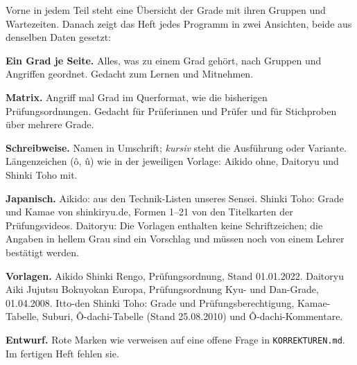 {\fontsize{10.5}{14.5}\selectfont\setlength\parskip{2.5mm}
Vorne in jedem Teil steht eine Übersicht der Grade mit ihren Gruppen und Wartezeiten.
Danach zeigt das Heft jedes Programm in zwei Ansichten, beide aus denselben Daten gesetzt:

\textbf{Ein Grad je Seite.} Alles, was zu einem Grad gehört, nach Gruppen und Angriffen
geordnet. Gedacht zum Lernen und Mitnehmen.

\textbf{Matrix.} Angriff mal Grad im Querformat, wie die bisherigen Prüfungsordnungen.
Gedacht für Prüferinnen und Prüfer und für Stichproben über mehrere Grade.

\textbf{Schreibweise.} Namen in Umschrift; \textit{kursiv} steht die Ausführung oder Variante.
Längenzeichen (ô, û) wie in der jeweiligen Vorlage: Aikido ohne, Daitoryu und Shinki Toho mit.

\textbf{Japanisch.} Aikido: aus den Technik-Listen unseres Sensei. Shinki Toho: Grade und
Kamae von shinkiryu.de, Formen 1–21 von den Titelkarten der Prüfungsvideos.
Daitoryu: Die Vorlagen enthalten keine Schriftzeichen; die Angaben in \textcolor{usuzumiv}{hellem Grau}
sind ein Vorschlag und müssen noch von einem Lehrer bestätigt werden.

\textbf{Vorlagen.} Aikido Shinki Rengo, Prüfungsordnung, Stand 01.01.2022.
Daitoryu Aiki Jujutsu Bokuyokan Europa, Prüfungsordnung Kyu- und Dan-Grade, 01.04.2008.
Itto-den Shinki Toho: Grade und Prüfungsberechtigung, Kamae-Tabelle, Suburi,
Ô-dachi-Tabelle (Stand 25.08.2010) und Ô-dachi-Kommentare.
\ifentwurf

\textbf{Entwurf.} Rote Marken wie  verweisen auf eine offene Frage in
\texttt{KORREKTUREN.md}. Im fertigen Heft fehlen sie.\fi
\par}
